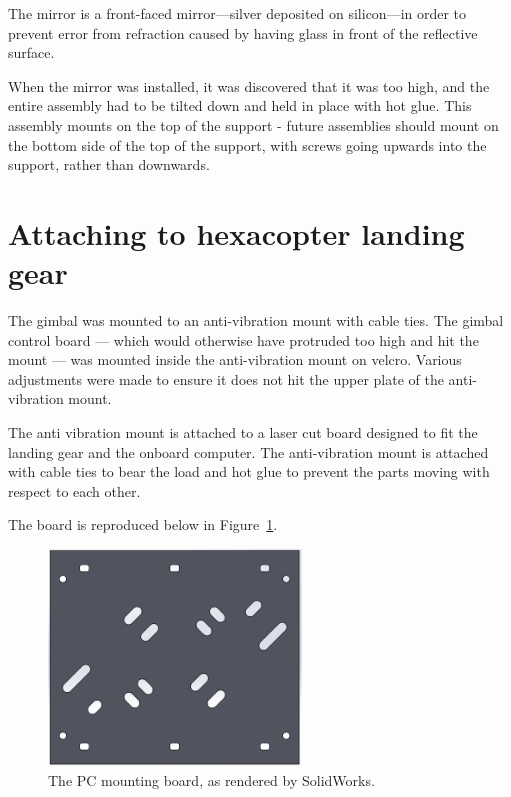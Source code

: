 \documentclass[12pt,oneside,a4paper]{book}
\begin{document}
The mirror is a front-faced mirror---silver deposited on silicon---in
order to prevent error from refraction caused by having glass in front
of the reflective surface.

When the mirror was installed, it was discovered that it was too high,
and the entire assembly had to be tilted down and held in place with
hot glue. This assembly mounts on the top of the support - future
assemblies should mount on the bottom side of the top of the support,
with screws going upwards into the support, rather than downwards.

\newpage
\section{Attaching to hexacopter landing gear}
\label{sec:attach-hexac-land}

The gimbal was mounted to an anti-vibration mount with cable
ties. The gimbal control board --- which would otherwise have
protruded too high and hit the mount --- was mounted inside the
anti-vibration mount on velcro. Various adjustments were made to
ensure it does not hit the upper plate of the anti-vibration mount.

The anti vibration mount is attached to a laser cut board designed to
fit the landing gear and the onboard computer. The anti-vibration
mount is attached with cable ties to bear the load and hot glue to
prevent the parts moving with respect to each other.

The board is reproduced below in Figure~\ref{fig:pc-mount}.

\begin{figure}[h]
  \centering
    \includegraphics[width=0.6\textwidth]{figs/pc-mount}
  \caption{The PC mounting board, as rendered by SolidWorks.}
  \label{fig:pc-mount}
\end{figure}
\end{document}
